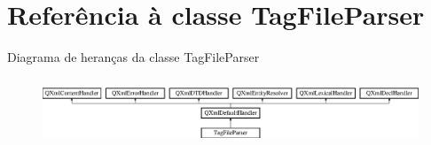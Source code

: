 \hypertarget{class_tag_file_parser}{\section{Referência à classe Tag\-File\-Parser}
\label{class_tag_file_parser}
}
Diagrama de heranças da classe Tag\-File\-Parser\begin{figure}[H]
\begin{center}
\leavevmode
\includegraphics[height=2.014389cm]{class_tag_file_parser}
\end{center}
\end{figure}
